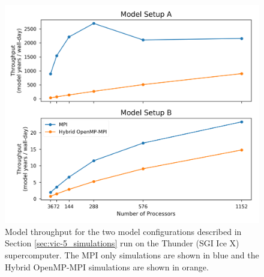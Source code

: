 \documentclass[gmd, manuscript]{copernicus}
\begin{document}
\clearpage
\begin{figure}[t]
\includegraphics[width=6in]{VIC_scaling.png}
\caption{Model throughput for the two model configurations described in Section \ref{sec:vic-5_simulations} run on the Thunder (SGI Ice X) supercomputer. The MPI only simulations are shown in blue and the Hybrid OpenMP-MPI simulations are shown in orange.}
\label{fig:vic_scaling}
\end{figure}


\end{document}
